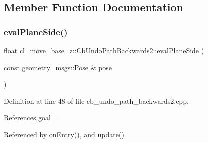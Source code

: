 \subsection{Member Function Documentation}
\mbox{\label{classcl__move__base__z_1_1CbUndoPathBackwards2_a20b9a6799b0484810b0319f5a97d020e}} 
\subsubsection{\texorpdfstring{eval\+Plane\+Side()}{evalPlaneSide()}}
{\footnotesize\ttfamily float cl\+\_\+move\+\_\+base\+\_\+z\+::\+Cb\+Undo\+Path\+Backwards2\+::eval\+Plane\+Side (\begin{DoxyParamCaption}\item[{const geometry\+\_\+msgs\+::\+Pose \&}]{pose }\end{DoxyParamCaption})\hspace{0.3cm}{\ttfamily [private]}}



Definition at line 48 of file cb\+\_\+undo\+\_\+path\+\_\+backwards2.\+cpp.



References goal\+\_\+.



Referenced by on\+Entry(), and update().


